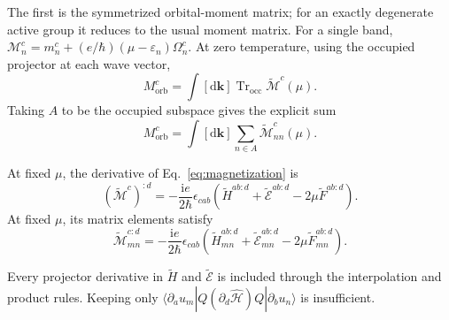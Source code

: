 \documentclass[prx,amsmath,amssymb,superscriptaddress,longbibliography]{revtex4-2}
\newcommand{\Tr}{\operatorname{Tr}}
\newcommand{\dd}{\mathrm{d}}
\newcommand{\ii}{\mathrm{i}}
\begin{document}
The first is the symmetrized orbital-moment matrix; for an exactly degenerate
active group it reduces to the usual moment matrix.
For a single band,
$\mathcal M_n^c=m_n^c+(e/\hbar)(\mu-\varepsilon_n)\Omega_n^c$.
At zero temperature, using the occupied projector at each wave vector,
\begin{equation}
 M_{\mathrm{orb}}^c=\int[\dd\bm k]\Tr_{\mathrm{occ}}
                    \widetilde{\mathcal M}^c(\mu).
 \label{eq:magnetization-integral}
\end{equation}
Taking $A$ to be the occupied subspace gives the explicit sum
\begin{equation}
 M_{\mathrm{orb}}^c=\int[\dd\bm k]\sum_{n\in A}
 \widetilde{\mathcal M}_{nn}^c(\mu).
 \label{eq:magnetization-integral-components}
\end{equation}

At fixed $\mu$, the derivative of Eq.~\eqref{eq:magnetization} is
\begin{equation}
 (\widetilde{\mathcal M}^c)^{:d}
 =-\frac{\ii e}{2\hbar}\epsilon_{cab}
 (\widetilde H^{ab:d}+\widetilde{\mathcal E}^{ab:d}-2\mu\widetilde F^{ab:d}).
 \label{eq:magnetization-derivative}
\end{equation}
At fixed $\mu$, its matrix elements satisfy
\begin{equation}
 \widetilde{\mathcal M}_{mn}^{c:d}
 =-\frac{\ii e}{2\hbar}\epsilon_{cab}
 (\widetilde H_{mn}^{ab:d}+\widetilde{\mathcal E}_{mn}^{ab:d}
                         -2\mu\widetilde F_{mn}^{ab:d}).
 \label{eq:magnetization-derivative-components}
\end{equation}

Every projector derivative in $\widetilde H$ and $\widetilde{\mathcal E}$ is included
through the interpolation and product rules. Keeping only
$\langle\partial_a u_m|Q(\partial_d\hat{\mathcal H})Q|\partial_b u_n\rangle$
is insufficient.
\end{document}

